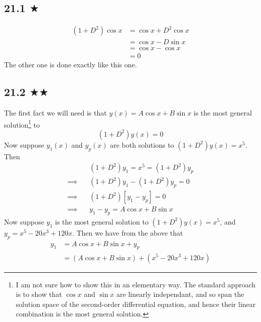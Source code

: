 

\subsection{21.1 $\bigstar$}
\begin{align*}
(1+D^2)\cos x&=\cos x+D^2\cos x\\
&=\cos x- D \sin x\\
&=\cos x-\cos x \\
&=0
\end{align*}
The other one is done exactly like this one.


\subsection{21.2 $\bigstar\bigstar$}
The first fact we will need is that $y(x)=A\cos x + B\sin x$ is the most general solution\footnote{I am not sure how to show this in an elementary way. The standard approach is to show that $\cos x$ and $\sin x$ are linearly independant, and so span the solution space of the second-order differential equation, and hence their linear combination is the most general solution.} to 
$$(1+D^2)y(x)=0$$
Now suppose $y_1(x)$ and $y_p(x)$ are both solutions to $(1+D^2)y(x)=x^5$. Then
\begin{align*}
&(1+D^2)y_1=x^5=(1+D^2)y_p\\
\implies \ \ \ \ & (1+D^2)y_1-(1+D^2)y_p=0\\
\implies \ \ \ \ & (1+D^2)[y_1-y_p]=0\\
\implies \ \ \ \ & y_1-y_p=A\cos x + B\sin x
\end{align*}
Now suppose $y_1$ is the most general solution to $(1+D^2)y(x)=x^5$, and $y_p=x^5-20x^3+120x$. Then we have from the above that 
\begin{align*}
y_1&=A\cos x + B\sin x+y_p\\
&=(A\cos x + B\sin x)+(x^5-20x^3+120x)\end{align*}


